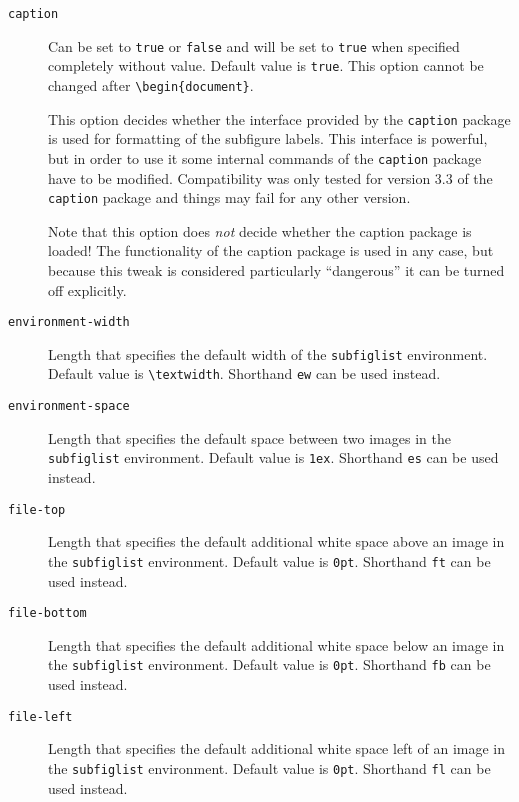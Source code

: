 \documentclass[version=3.12,american]{scrartcl}
\begin{document}
\begin{description}
\item[\texttt{caption}\enskip] Can be set to \texttt{true} or \texttt{false} and will be set to \texttt{true} when specified completely without value. Default value is \texttt{true}. This option cannot be changed after \verb|\begin{document}|.

This option decides whether the interface provided by the \texttt{caption} package is used for formatting of the subfigure labels. This interface is powerful, but in order to use it some internal commands of the \texttt{caption} package have to be modified. Compatibility was only tested for version 3.3 of the \texttt{caption} package and things may fail for any other version.

Note that this option does \emph{not} decide whether the caption package is loaded! The functionality of the caption package is used in any case, but because this tweak is considered particularly ``dangerous'' it can be turned off explicitly.

\item[\texttt{environment-width}\enskip] Length that specifies the default width of the \texttt{subfiglist} environment. Default value is \verb|\textwidth|. Shorthand \texttt{ew} can be used instead.

\item[\texttt{environment-space}\enskip] Length that specifies the default space between two images in the \texttt{subfiglist} environment. Default value is \texttt{1ex}. Shorthand \texttt{es} can be used instead.

\item[\texttt{file-top}\enskip] Length that specifies the default additional white space above an image in the \texttt{subfiglist} environment. Default value is \texttt{0pt}. Shorthand \texttt{ft} can be used instead.

\item[\texttt{file-bottom}\enskip] Length that specifies the default additional white space below an image in the \texttt{subfiglist} environment. Default value is \texttt{0pt}. Shorthand \texttt{fb} can be used instead.

\item[\texttt{file-left}\enskip] Length that specifies the default additional white space left of an image in the \texttt{subfiglist} environment. Default value is \texttt{0pt}. Shorthand \texttt{fl} can be used instead.


\end{description}
\end{document}
